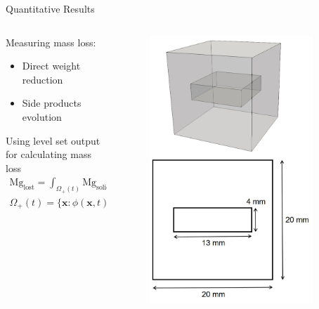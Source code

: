\documentclass[11pt,t]{beamer}
\begin{document}
\begin{frame}[fragile]{Quantitative Results}

	\begin{columns}[t]
		\begin{column}{.65\textwidth}
			Measuring mass loss:
			\begin{itemize}
			\item
			Direct weight reduction
			\item
			Side products evolution
			\end{itemize}
			
		Using level set output for calculating mass loss
			\begin{gather*}
			\mathrm{Mg}_{\mathrm{lost}}=\int_{\Omega_{+}(t)} \mathrm{Mg}_{\mathrm{solid}} \mathrm{d} V-\int_{\Omega_{+}(0)} \mathrm{Mg}_{\mathrm{solid}} \mathrm{d} V_{0}
			\end{gather*}		
			\begin{gather*}
			\Omega_{+}(t)=\{\mathbf{x}: \phi(\mathbf{x}, t) \geq 0\}
			\end{gather*}
		\end{column}
		\begin{column}{.35\textwidth}
			\vspace{-2cm}
			\begin{figure}
			\centering
			\includegraphics[width=0.9\textwidth]{simulation_setup}
			

\end{figure}
\end{column}
\end{columns}
\end{frame}
\end{document}
